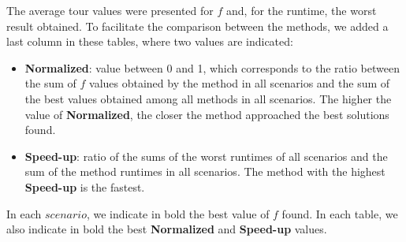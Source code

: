 \documentclass[preprint,authoryear]{elsarticle}
\begin{document}
The average tour values were presented for $f$ and, for the runtime, the worst result obtained. To facilitate the comparison between the methods, we added a last column in these tables, where two values are indicated:
\begin{itemize}
	\item {\bf Normalized}: value between 0 and 1, which corresponds to the ratio between the sum of $f$\/ values obtained by the method in all scenarios and the sum of the best values obtained among all methods in all scenarios. The higher the value of {\bf Normalized}, the closer the method approached the best solutions found.
	\item {\bf Speed-up}: ratio of the sums of the worst runtimes of all scenarios and the sum of the method runtimes in all scenarios. The method with the highest {\bf Speed-up}\/ is the fastest.
\end{itemize}

In each $scenario$, we indicate in bold the best value of $f$\/ found. In each table, we also indicate in bold the best {\bf Normalized}\/ and {\bf Speed-up}\/ values.


\vspace{2.0mm}
\end{document}

